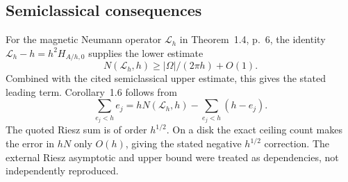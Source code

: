 \documentclass[10pt]{article}
\begin{document}
\subsection*{Semiclassical consequences}
For the magnetic Neumann operator \(\mathcal L_h\) in Theorem 1.4, p. 6, the identity \(\mathcal L_h-h=h^2H_{A/h,0}\) supplies the lower estimate \[N(\mathcal L_h,h)\geq |\Omega|/(2\pi h)+O(1).\] Combined with the cited semiclassical upper estimate, this gives the stated leading term. Corollary 1.6 follows from \[\sum_{e_j<h}e_j=hN(\mathcal L_h,h)-\sum_{e_j<h}(h-e_j).\] The quoted Riesz sum is of order \(h^{1/2}\). On a disk the exact ceiling count makes the error in \(hN\) only \(O(h)\), giving the stated negative \(h^{1/2}\) correction. The external Riesz asymptotic and upper bound were treated as dependencies, not independently reproduced.\par
\end{document}
